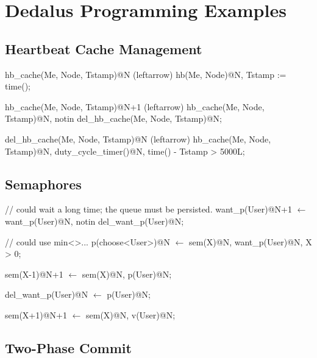\section{Dedalus Programming Examples}

\subsection{Heartbeat Cache Management}

\begin{Dedalus}
\small
hb_cache(Me, Node, Tstamp)@N (leftarrow)
    hb(Me, Node)@N,
    Tstamp := time();

hb_cache(Me, Node, Tstamp)@N+1 (leftarrow)
    hb_cache(Me, Node, Tstamp)@N,
    notin del_hb_cache(Me, Node, Tstamp)@N;

del_hb_cache(Me, Node, Tstamp)@N (leftarrow)
    hb_cache(Me, Node, Tstamp)@N, 
    duty_cycle_timer()@N,
    time() - Tstamp > 5000L;
\end{Dedalus}

\subsection{Semaphores}

\begin{Dedalus}
\small
// could wait a long time; the queue must 
be persisted.
want_p(User)@N+1 \(\leftarrow\)
    want_p(User)@N,
    notin del_want_p(User)@N;

// could use min<>...
p(choose<User>)@N \(\leftarrow\)
    sem(X)@N,
    want_p(User)@N,
    X > 0;

sem(X-1)@N+1 \(\leftarrow\)
    sem(X)@N,
    p(User)@N;

del_want_p(User)@N \(\leftarrow\)
    p(User)@N;
 
sem(X+1)@N+1 \(\leftarrow\)
    sem(X)@N,
    v(User)@N;
\end{Dedalus}

\subsection{Two-Phase Commit}

